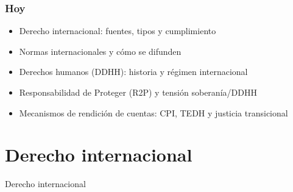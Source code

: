 \begin{frame}
  \titlepage
\end{frame}

\begin{frame}
\frametitle{Hoy}
\centering
\vspace{1.5em}
\begin{itemize}
  \setlength{\itemsep}{10pt}
  \item Derecho internacional: fuentes, tipos y cumplimiento
  \item Normas internacionales y cómo se difunden
  \item Derechos humanos (DDHH): historia y régimen internacional
  \item Responsabilidad de Proteger (R2P) y tensión soberanía/DDHH
  \item Mecanismos de rendición de cuentas: CPI, TEDH y justicia transicional
\end{itemize}
\end{frame}
\note{}

\section{Derecho internacional}

\begin{transitionframe}
Derecho internacional
\end{transitionframe}
\note{}

